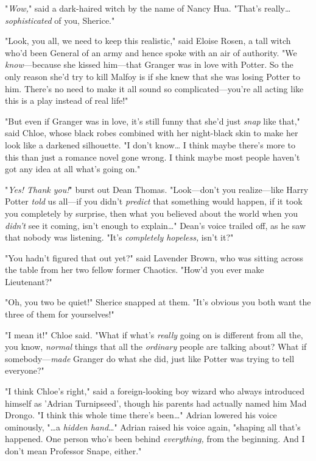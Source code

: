 "\emph{Wow,}" said a dark-haired witch by the name of Nancy Hua. "That's really{\ldots} \emph{sophisticated} of you, Sherice."

"Look, you all, we need to keep this realistic," said Eloise Rosen, a tall witch who'd been General of an army and hence spoke with an air of authority. "We \emph{know}---because she kissed him---that Granger was in love with Potter. So the only reason she'd try to kill Malfoy is if she knew that she was losing Potter to him. There's no need to make it all sound so complicated---you're all acting like this is a play instead of real life!"

"But even if Granger was in love, it's still funny that she'd just \emph{snap} like that," said Chloe, whose black robes combined with her night-black skin to make her look like a darkened silhouette. "I don't know{\ldots} I think maybe there's more to this than just a romance novel gone wrong. I think maybe most people haven't got any idea at all what's going on."

"\emph{Yes! Thank you!}" burst out Dean Thomas. "Look---don't you realize---like Harry Potter \emph{told} us all---if you didn't \emph{predict} that something would happen, if it took you completely by surprise, then what you believed about the world when you \emph{didn't} see it coming, isn't enough to explain{\ldots}" Dean's voice trailed off, as he saw that nobody was listening. "It's \emph{completely hopeless,} isn't it?"

"You hadn't figured that out yet?" said Lavender Brown, who was sitting across the table from her two fellow former Chaotics. "How'd you ever make Lieutenant?"

"Oh, you two be quiet!" Sherice snapped at them. "It's obvious you both want the three of them for yourselves!"

"I mean it!" Chloe said. "What if what's \emph{really} going on is different from all the, you know, \emph{normal} things that all the \emph{ordinary} people are talking about? What if somebody---\emph{made} Granger do what she did, just like Potter was trying to tell everyone?"

"I think Chloe's right," said a foreign-looking boy wizard who always introduced himself as 'Adrian Turnipseed', though his parents had actually named him Mad Drongo. "I think this whole time there's been{\ldots}" Adrian lowered his voice ominously, "{\ldots}a \emph{hidden hand}{\ldots}" Adrian raised his voice again, "shaping all that's happened. One person who's been behind \emph{everything,} from the beginning. And I don't mean Professor Snape, either."

